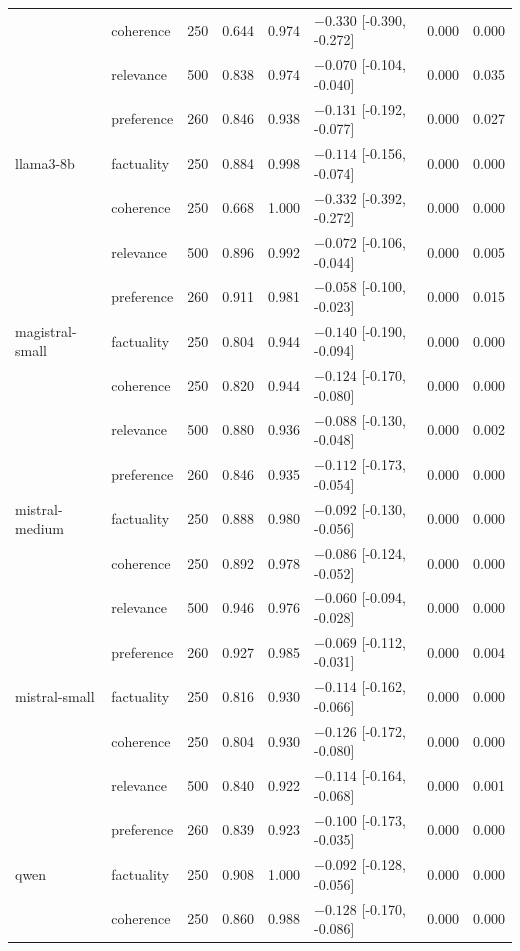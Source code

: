 \begin{table}[t]
\begin{tabular}{llrrrlrr}
 & coherence & 250 & 0.644 & 0.974 & $-0.330$ [-0.390, -0.272] & 0.000 & 0.000 \\
 & relevance & 500 & 0.838 & 0.974 & $-0.070$ [-0.104, -0.040] & 0.000 & 0.035 \\
 & preference & 260 & 0.846 & 0.938 & $-0.131$ [-0.192, -0.077] & 0.000 & 0.027 \\
\addlinespace
llama3-8b & factuality & 250 & 0.884 & 0.998 & $-0.114$ [-0.156, -0.074] & 0.000 & 0.000 \\
 & coherence & 250 & 0.668 & 1.000 & $-0.332$ [-0.392, -0.272] & 0.000 & 0.000 \\
 & relevance & 500 & 0.896 & 0.992 & $-0.072$ [-0.106, -0.044] & 0.000 & 0.005 \\
 & preference & 260 & 0.911 & 0.981 & $-0.058$ [-0.100, -0.023] & 0.000 & 0.015 \\
\addlinespace
magistral-small & factuality & 250 & 0.804 & 0.944 & $-0.140$ [-0.190, -0.094] & 0.000 & 0.000 \\
 & coherence & 250 & 0.820 & 0.944 & $-0.124$ [-0.170, -0.080] & 0.000 & 0.000 \\
 & relevance & 500 & 0.880 & 0.936 & $-0.088$ [-0.130, -0.048] & 0.000 & 0.002 \\
 & preference & 260 & 0.846 & 0.935 & $-0.112$ [-0.173, -0.054] & 0.000 & 0.000 \\
\addlinespace
mistral-medium & factuality & 250 & 0.888 & 0.980 & $-0.092$ [-0.130, -0.056] & 0.000 & 0.000 \\
 & coherence & 250 & 0.892 & 0.978 & $-0.086$ [-0.124, -0.052] & 0.000 & 0.000 \\
 & relevance & 500 & 0.946 & 0.976 & $-0.060$ [-0.094, -0.028] & 0.000 & 0.000 \\
 & preference & 260 & 0.927 & 0.985 & $-0.069$ [-0.112, -0.031] & 0.000 & 0.004 \\
\addlinespace
mistral-small & factuality & 250 & 0.816 & 0.930 & $-0.114$ [-0.162, -0.066] & 0.000 & 0.000 \\
 & coherence & 250 & 0.804 & 0.930 & $-0.126$ [-0.172, -0.080] & 0.000 & 0.000 \\
 & relevance & 500 & 0.840 & 0.922 & $-0.114$ [-0.164, -0.068] & 0.000 & 0.001 \\
 & preference & 260 & 0.839 & 0.923 & $-0.100$ [-0.173, -0.035] & 0.000 & 0.000 \\
\addlinespace
qwen & factuality & 250 & 0.908 & 1.000 & $-0.092$ [-0.128, -0.056] & 0.000 & 0.000 \\
 & coherence & 250 & 0.860 & 0.988 & $-0.128$ [-0.170, -0.086] & 0.000 & 0.000 \\

\end{tabular}
\end{table}
